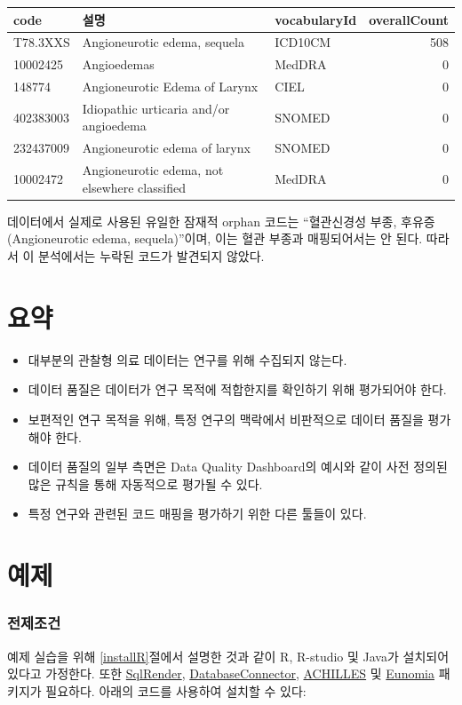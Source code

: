 \documentclass[11pt]{book}
\theoremstyle{definition}
\theoremstyle{definition}
\theoremstyle{definition}
\theoremstyle{remark}
\let\BeginKnitrBlock\begin \let\EndKnitrBlock\end
\begin{document}
\begin{longtable}[]{@{}lllr@{}}
\toprule
code & 설명 & vocabularyId & overallCount\tabularnewline
\midrule
\endhead
T78.3XXS & Angioneurotic edema, sequela & ICD10CM & 508\tabularnewline
10002425 & Angioedemas & MedDRA & 0\tabularnewline
148774 & Angioneurotic Edema of Larynx & CIEL & 0\tabularnewline
402383003 & Idiopathic urticaria and/or angioedema & SNOMED &
0\tabularnewline
232437009 & Angioneurotic edema of larynx & SNOMED & 0\tabularnewline
10002472 & Angioneurotic edema, not elsewhere classified & MedDRA &
0\tabularnewline
\bottomrule
\end{longtable}

데이터에서 실제로 사용된 유일한 잠재적 orphan 코드는 ``혈관신경성 부종,
후유증(Angioneurotic edema, sequela)''이며, 이는 혈관 부종과
매핑되어서는 안 된다. 따라서 이 분석에서는 누락된 코드가 발견되지
않았다.

\section{요약}\label{-13}

\BeginKnitrBlock{rmdsummary}
\begin{itemize}
\item
  대부분의 관찰형 의료 데이터는 연구를 위해 수집되지 않는다.
\item
  데이터 품질은 데이터가 연구 목적에 적합한지를 확인하기 위해 평가되어야
  한다.
\item
  보편적인 연구 목적을 위해, 특정 연구의 맥락에서 비판적으로 데이터
  품질을 평가해야 한다.
\item
  데이터 품질의 일부 측면은 Data Quality Dashboard의 예시와 같이 사전
  정의된 많은 규칙을 통해 자동적으로 평가될 수 있다.
\item
  특정 연구와 관련된 코드 매핑을 평가하기 위한 다른 툴들이 있다.
\end{itemize}
\EndKnitrBlock{rmdsummary}

\section{예제}\label{-9}

\subsubsection*{전제조건}\label{-7}

예제 실습을 위해 \ref{installR}절에서 설명한 것과 같이 R, R-studio 및
Java가 설치되어 있다고 가정한다. 또한
\href{https://ohdsi.github.io/SqlRender/}{SqlRender},
\href{https://ohdsi.github.io/DatabaseConnector/}{DatabaseConnector},
\href{https://github.com/OHDSI/Achilles}{ACHILLES} 및
\href{https://ohdsi.github.io/Eunomia/}{Eunomia} 패키지가 필요하다.
아래의 코드를 사용하여 설치할 수 있다:
\end{document}
